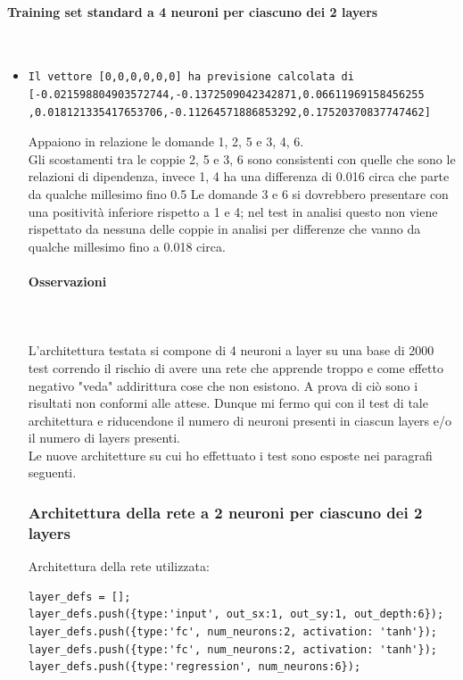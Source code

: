 \paragraph{Training set standard a 4 neuroni per ciascuno dei 2 layers}\mbox{}
\label{Training set standard a 4 neuroni per ciascuno dei 2 layers}
\\
\noindent
\begin{itemize}
\item \begin{verbatim}Il vettore [0,0,0,0,0,0] ha previsione calcolata di [-0.021598804903572744,-0.1372509042342871,0.06611969158456255
,0.018121335417653706,-0.11264571886853292,0.17520370837747462]\end{verbatim}
Appaiono in relazione le domande 1, 2, 5 e 3, 4, 6.\\
Gli scostamenti tra le coppie 2, 5 e 3, 6 sono consistenti con quelle che sono le relazioni di dipendenza, invece 1, 4 ha una differenza di 0.016 circa che parte da qualche millesimo fino 0.5
Le domande 3 e 6 si dovrebbero presentare con una positivit\`a inferiore rispetto a 1 e 4; nel test in analisi questo non viene rispettato da nessuna delle coppie in analisi per differenze che vanno da qualche millesimo fino a 0.018 circa.
\paragraph{Osservazioni}\mbox{}
\label{Osservazioni su rete a 4 neuroni per ciascuno dei 2 layers}
\\\\
\noindent
L'architettura testata si compone di 4 neuroni a layer su una base di 2000 test correndo il rischio di avere una rete che apprende troppo e come effetto negativo "veda" addirittura cose che non esistono. A prova di ci\`o sono i risultati non conformi alle attese.
Dunque mi fermo qui con il test di tale architettura e riducendone il numero di neuroni presenti in ciascun layers e/o il numero di layers presenti.\\

Le nuove architetture su cui ho effettuato i test sono esposte nei paragrafi seguenti.

\subsubsection{Architettura della rete a 2 neuroni per ciascuno dei 2 layers}
\label{Architettura della rete a 2 neuroni per ciascuno dei 2 layers}
Architettura  della rete utilizzata:\\
\begin{verbatim}layer_defs = [];
layer_defs.push({type:'input', out_sx:1, out_sy:1, out_depth:6});
layer_defs.push({type:'fc', num_neurons:2, activation: 'tanh'});
layer_defs.push({type:'fc', num_neurons:2, activation: 'tanh'});
layer_defs.push({type:'regression', num_neurons:6});


\end{verbatim}
\end{itemize}
